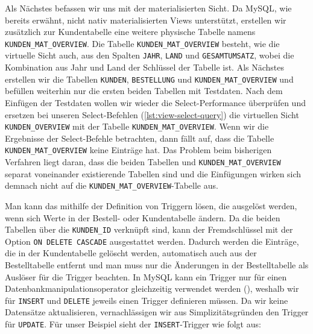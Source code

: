 Als Nächstes befassen wir uns mit der materialisierten Sicht.
Da MySQL, wie bereits erwähnt, nicht nativ materialisierten Views unterstützt, erstellen wir zusätzlich zur Kundentabelle eine weitere physische Tabelle namens \texttt{KUNDEN\_MAT\_OVERVIEW}.
Die Tabelle \texttt{KUNDEN\_MAT\_OVERVIEW} besteht, wie die virtuelle Sicht auch, aus den Spalten \texttt{JAHR}, \texttt{LAND} und \texttt{GESAMTUMSATZ}, wobei die Kombination aus Jahr und Land der Schlüssel der Tabelle ist.
Als Nächstes erstellen wir die Tabellen \texttt{KUNDEN}, \texttt{BESTELLUNG} und \texttt{KUNDEN\_MAT\_OVERVIEW} und befüllen weiterhin nur die ersten beiden Tabellen mit Testdaten.
Nach dem Einfügen der Testdaten wollen wir wieder die Select-Performance überprüfen und ersetzen bei unseren Select-Befehlen (\ref{lst:view-select-query}) die virtuellen Sicht \texttt{KUNDEN\_OVERVIEW} mit der Tabelle \texttt{KUNDEN\_MAT\_OVERVIEW}.
Wenn wir die Ergebnisse der Select-Befehle betrachten, dann fällt auf, dass die Tabelle \texttt{KUNDEN\_MAT\_OVERVIEW} keine Einträge hat.
Das Problem beim bisherigen Verfahren liegt daran, dass die beiden Tabellen und \texttt{KUNDEN\_MAT\_OVERVIEW} separat voneinander existierende Tabellen sind und die Einfügungen wirken sich demnach nicht auf die \texttt{KUNDEN\_MAT\_OVERVIEW}-Tabelle aus.

Man kann das mithilfe der Definition von Triggern lösen, die ausgelöst werden, wenn sich Werte in der Bestell- oder Kundentabelle ändern.
Da die beiden Tabellen über die \texttt{KUNDEN\_ID} verknüpft sind, kann der Fremdschlüssel mit der Option \texttt{ON DELETE CASCADE} ausgestattet werden.
Dadurch werden die Einträge, die in der Kundentabelle gelöscht werden, automatisch auch aus der Bestelltabelle entfernt und man muss nur die Änderungen in der Bestelltabelle als Auslöser für die Trigger beachten.
In MySQL kann ein Trigger nur für einen Datenbankmanipulationsoperator gleichzeitig verwendet werden (\cite{mysql_trigger_syntax}), weshalb wir für \texttt{INSERT} und \texttt{DELETE} jeweils einen Trigger definieren müssen.
Da wir keine Datensätze aktualisieren, vernachlässigen wir aus Simplizitätsgründen den Trigger für \texttt{UPDATE}.
\newpage
Für unser Beispiel sieht der \texttt{INSERT}-Trigger wie folgt aus:

\vspace{-5pt}


